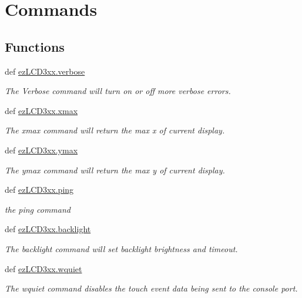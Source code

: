 \hypertarget{group___general}{\section{Commands}
\label{group___general}
}
\subsection*{Functions}
\begin{DoxyCompactItemize}
\item 
def \hyperlink{group___general_gaa497e8573c045944d589b17fd7dd36ac}{ez\-L\-C\-D3xx.\-verbose}
\begin{DoxyCompactList}\small\item\em The Verbose command will turn on or off more verbose errors. \end{DoxyCompactList}\item 
def \hyperlink{group___general_gabe06f9371514b4556accd06145b9c104}{ez\-L\-C\-D3xx.\-xmax}
\begin{DoxyCompactList}\small\item\em The xmax command will return the max x of current display. \end{DoxyCompactList}\item 
def \hyperlink{group___general_gabcb8010d7c29b1c514e70cefe3bb856c}{ez\-L\-C\-D3xx.\-ymax}
\begin{DoxyCompactList}\small\item\em The ymax command will return the max y of current display. \end{DoxyCompactList}\item 
def \hyperlink{group___general_ga92454899475445ff2d48eb7072f3c94e}{ez\-L\-C\-D3xx.\-ping}
\begin{DoxyCompactList}\small\item\em the ping command \end{DoxyCompactList}\item 
def \hyperlink{group___general_gacecf5c1b5956caef4a4030f51bc4a809}{ez\-L\-C\-D3xx.\-backlight}
\begin{DoxyCompactList}\small\item\em The backlight command will set backlight brightness and timeout. \end{DoxyCompactList}\item 
def \hyperlink{group___general_ga78b38855b8bcb0609d340a80210a0d0f}{ez\-L\-C\-D3xx.\-wquiet}
\begin{DoxyCompactList}\small\item\em The wquiet command disables the touch event data being sent to the console port. \end{DoxyCompactList}\item 

\end{DoxyCompactItemize}
